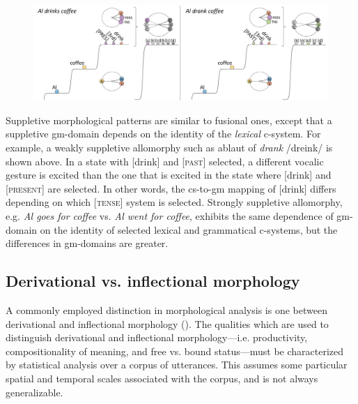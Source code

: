   
\begin{figure}
\includegraphics[width=\textwidth]{figures/Tilsen-img69.png}
\caption{\missingcaption}
\label{fig:4:19}
\end{figure}
 

  Suppletive morphological patterns are similar to fusional ones, except that a suppletive gm-domain depends on the identity of the \textit{lexical} c-system. For example, a weakly suppletive allomorphy such as ablaut of \textit{drank} /dreink/ is shown above. In a state with [drink] and [\textsc{past}] selected, a different vocalic gesture is excited than the one that is excited in the state where [drink] and [\textsc{present}] are selected. In other words, the cs-to-gm mapping of [drink] differs depending on which [\textsc{tense}] system is selected. Strongly suppletive allomorphy, e.g. \textit{Al goes for coffee} vs. \textit{Al went for coffee}, exhibits the same dependence of gm-domain on the identity of selected lexical and grammatical c-systems, but the differences in gm-domains are greater.

\subsection{Derivational vs. inflectional morphology}

A commonly employed distinction in morphological analysis is one between derivational and inflectional morphology (\citealt{BickelNichols2007,Booij1996,Dressler1989,HaspelmathSims2013}). The qualities which are used to distinguish derivational and inflectional morphology—i.e. productivity, compositionality of meaning, and free vs. bound status—must be characterized by statistical analysis over a corpus of utterances. This assumes some particular spatial and temporal scales associated with the corpus, and is not always generalizable. 

